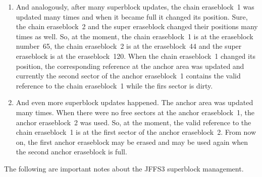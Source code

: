\documentclass[12pt,a4paper,oneside,titlepage]{article}
\begin{document}
\begin{enumerate}
\item And analogously, after many superblock updates, the chain eraseblock~1
was updated many times and when it became full it changed its position.  Sure,
the chain eraseblock~2 and the super eraseblock changed their positions many
times as well. So, at the moment, the chain eraseblock~1 is at the eraseblock
number~65, the chain eraseblock~2 is at the eraseblock~44 and the super
eraseblock is at the eraseblock~120. When the chain eraseblock~1 changed its
position, the corresponding reference at the anchor area was updated and
currently the second sector of the anchor eraseblock~1 contains the valid
reference to the chain eraseblock~1 while the firs sector is dirty.

\item And even more superblock updates happened. The anchor area was updated
many times. When there were no free sectors at the anchor eraseblock~1, the
anchor eraseblock~2 was used. So, at the moment, the valid reference to the
chain eraseblock~1 is at the first sector of the anchor eraseblock~2. From now
on, the first anchor eraseblock may be erased and may be used again when the
second anchor eraseblock is full.

\end{enumerate}

The following are important notes about the JFFS3 superblock management.
\end{document}
